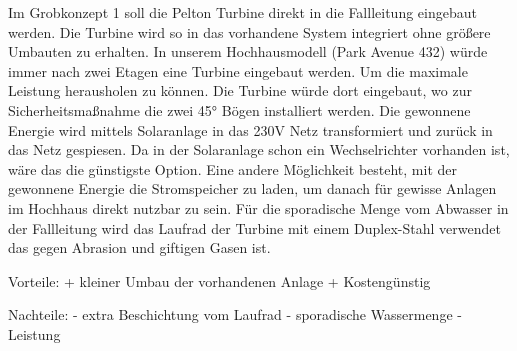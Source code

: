 Im Grobkonzept 1 soll die Pelton Turbine direkt in die Fallleitung eingebaut werden. Die Turbine wird so in das vorhandene System integriert ohne größere Umbauten zu erhalten.
In unserem Hochhausmodell (Park Avenue 432) würde immer nach zwei Etagen eine Turbine eingebaut werden. Um die maximale Leistung herausholen zu können. Die Turbine würde dort eingebaut, wo zur Sicherheitsmaßnahme die zwei 45° Bögen installiert werden. 
Die gewonnene Energie wird mittels Solaranlage in das 230V Netz transformiert und zurück in das Netz gespiesen. Da in der Solaranlage schon ein Wechselrichter vorhanden ist, wäre das die günstigste Option. Eine andere Möglichkeit besteht, mit der gewonnene Energie die Stromspeicher zu laden, um danach für gewisse Anlagen im Hochhaus direkt nutzbar zu sein.
Für die sporadische Menge vom Abwasser in der Fallleitung wird das Laufrad der Turbine mit einem Duplex-Stahl verwendet das gegen Abrasion und giftigen Gasen ist.

Vorteile:
+	kleiner Umbau der vorhandenen Anlage
+	Kostengünstig
	
Nachteile:
- 	extra Beschichtung vom Laufrad
-	sporadische Wassermenge
-	Leistung


